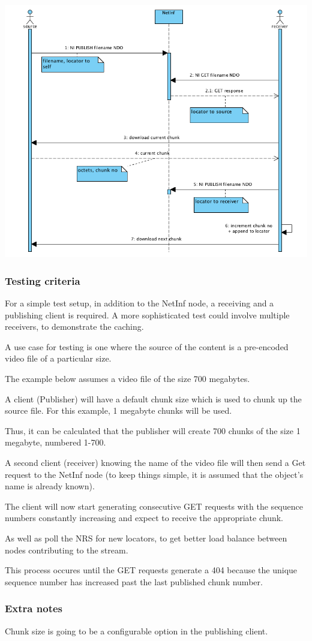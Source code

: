 \includegraphics[scale=0.5]{./img/sequence_diagram_streaming.png}

\subsubsection{Testing criteria} 

For a simple test setup, in addition to the NetInf node, a receiving and a publishing client is required. A more sophisticated test could involve multiple receivers, to demonstrate the caching.

A use case for testing is one where the source of the content is a pre-encoded video file of a particular size.

The example below assumes a video file of the size 700 megabytes.

A client (Publisher) will have a default chunk size which is used to chunk up the source file. For this example, 1 megabyte chunks will be used.

Thus, it can be calculated that the publisher will create 700 chunks of the size 1 megabyte, numbered 1-700.

A second client (receiver) knowing the name of the video file will then send a Get request to the NetInf node (to keep things simple, it is assumed that the object's name is already known).

The client will now start generating consecutive GET requests with the sequence numbers constantly increasing and expect to receive the appropriate chunk.

As well as  poll the NRS for new locators, to get better load balance between nodes contributing to the stream.

This process occures until the GET requests generate a 404 because the unique sequence number has increased past the last published chunk number.

\subsubsection{Extra notes}

Chunk size is going to be a configurable option in the publishing client.
